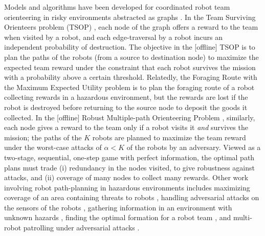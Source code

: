\documentclass[11pt, oneside]{article}
\begin{document}
Models and algorithms have been developed for coordinated robot team orienteering in risky environments abstracted as graphs \cite{zhou2021multi}. 
In the Team Surviving Orienteers problem (TSOP) \cite{jorgensen2018team,jorgensen2017matroid,jorgensen2024matroid}, each node of the graph offers a reward to the team when visited by a robot, and each edge-traversal by a robot incurs an independent probability of destruction. The objective in the [offline] TSOP is to plan the paths of the robots (from a source to destination node) to maximize the expected team reward under the constraint that each robot survives the mission with a probability above a certain threshold. 
Relatedly, the Foraging Route with the Maximum Expected Utility problem \cite{di2022foraging} is to plan the foraging route of a robot collecting rewards in a hazardous environment, but the rewards are lost if the robot is destroyed before returning to the source node to deposit the goods it collected.
In the [offline] Robust Multiple-path Orienteering Problem \cite{shi2023robust}, similarly, each node gives a reward to the team only if a robot visits it \emph{and} survives the mission; the paths of the $K$ robots are planned to maximize the team reward under the worst-case attacks of $\alpha<K$ of the robots by an adversary. 
Viewed as a two-stage, sequential, one-step game with perfect information, the optimal path plans must trade (i) redundancy in the nodes visited, to give robustness against attacks, and (ii) coverage of many nodes to collect many rewards.
Other work involving robot path-planning in hazardous environments includes 
maximizing coverage of an area containing threats to robots \cite{korngut2023multi,yehoshua2016robotic}, 
handling adversarial attacks on the sensors of the robots \cite{liu2021distributed,zhou2022distributed,mayya2022adaptive,zhou2018resilient}, 
gathering information in an environment with unknown hazards \cite{schwager2017multi},
finding the optimal formation for a robot team \cite{shapira2015path},
and 
multi-robot patrolling under adversarial attacks \cite{huang2019survey}.
\end{document}
